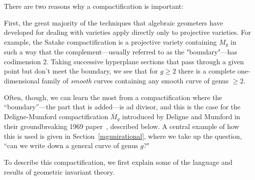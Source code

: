 There are two reasons why a compactification is  important:

First, the great majority of the techniques that algebraic geometers have developed for dealing with varieties apply directly only to projective varieties. For example, the Satake compactification is a projective variety containing $M_g$ in such a way that the complement---usually referred to as the "boundary"---has codimension 2. Taking successive hyperplane sections that pass through a given point but don't meet the boundary, we see that for $g\geq 2$ there is a complete one-dimensional family of \emph{smooth} curves containing any smooth curve of genus $\geq 2$. 

Often, though, we can learn the most from a compactification where the ``boundary''---the part that is added---is ad divisor, and this is the case for the Deligne-Mumford compactification
$\overline M_g$ introduced by Deligne and Mumford in their groundbreaking 1969 paper~\cite{Deligne-Mumford}, described below. A central example of how this is used is given in Section~\ref{mgunirational}, where we take up the question, ``can we write down a general curve of genus $g$?" 

To describe this compactification, we first explain some of the language and results of geometric
invariant theory.






